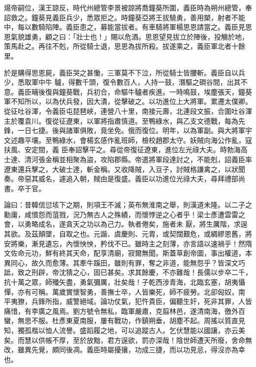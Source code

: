 \begin{pinyinscope}
 煬帝嗣位，漢王諒反，時代州總管李景被諒將喬鐘葵所圍，義臣時為朔州總管，奉詔救之。鐘葵見義臣兵少，悉眾拒之。時鐘葵亞將王拔驍勇，善用槊，射者不能中，每以數騎陷陣。義臣患之，募能當拔者。有車騎將軍楊思恩請當之。義臣見思恩氣貌雄勇，顧之曰：「壯士也！」賜以危酒。思恩望見拔立於陣後，投觴於地，策馬赴之。再往不剋，所從騎士退，思恩為拔所殺。拔遂乘之，義臣軍北者十餘里。



 於是購得思恩屍，義臣哭之甚慟，三軍莫不下泣，所從騎士皆腰斬。義臣自以兵少，悉取軍中牛
 驢，得數千頭，復令數百人，人持一鼓，潛驅之磵谷間，出其不意。義臣晡後復與鐘葵戰，兵初合，命驅牛驢者疾進。一時鳴鼓，埃塵張天，鐘葵軍不知所以，以為伏兵發，因大潰，從擊破之。以功進位上大將軍。累遷太僕卿。從征吐谷渾，令義臣屯琵琶峽，連營八十里，南接元壽，北連段文振，合圍吐谷渾主於覆袁川。復從征遼東，以軍將指肅慎道。至鴨綠水，與乙支文德戰，每為先鋒，一日七捷。後與諸軍俱敗，竟坐免。俄而復位。明年，以為軍副。與大將軍宇文述趣平壤。至鴨綠水，會楊玄感作亂班師，檢校趙郡太守。妖賊向海公作亂，寇扶風、安定間，義
 臣奉詔擊平之。尋從帝復征遼東，進位左光祿大夫。時勃海高士達、清河張金稱並相聚為盜，攻陷郡縣。帝遣將軍段達討之，不能剋，詔義臣率遼東還兵擊之，大破士達，斬金稱。又收降賊，入豆子，討賊格謙禽之，以狀聞奏。帝惡其威名，遽追入朝，賊由是復盛。義臣以功進位光祿大夫，尋拜禮部尚書。卒于官。



 論曰：昔韓信愆垓下之期，則項王不滅；英布無淮南之舉，則漢道未隆。以二子之勳庸，咸憤怨而菹戮，況乃無古人之殊績，而懷悖逆之心者乎！梁士彥遭雲雷之會，以勇略成名，遂貪天之功以為己力。執者倦矣，施者未
 厭，將生厲階，求逞其欲。及茲顛墜，自取之也。元諧、虞慶則、元胄，或契闊艱危，或綢繆恩舊，將安將樂，漸見遺忘，內懷怏怏，矜伐不已。雖時主之刻薄，亦言語以速禍乎！然隋文佐命元功，鮮有終其天命，配享清廟，寂爾無聞。斯蓋草創帝圖，事出權道，本異同心，故久而愈薄。其牽牛蹊田，雖則有罪，奪之非道，能無怨乎？皆深文巧詆，致之刑辟，帝沈猜之心，固已甚矣。求其餘慶，不亦難哉！長儒以步卒二千，抗十萬之眾，師殲矢盡，勇氣彌厲，壯矣哉！子乾西涉青海，北臨玄塞，胡夷懾憚，亦有可稱。萬歲實懷智勇，善撫士卒，人皆樂死，師不疲勞。北卻匈奴，南
 平夷獠，兵鋒所指，威警絕域。論功仗氣，犯忤貴臣，偏聽生奸，死非其罪，人皆痛惜，有李廣之風焉。劉方號令無私，臨軍嚴肅，克翦林邑，遂清南海，徼外百蠻，無思不服。杜彥東夏南服，屢有戰功，作鎮朔垂，胡塵不起。周搖以質直見知，獨孤楷以恤人流譽。盛蹈履之地，可以追蹤古人。乞伏慧能以國讓，亦云美矣。而慧以供帳不厚，至於放黜，君方逞欲，罰亦深哉！陰世師遭天所廢，舍命無改，雖異先覺，頗同後凋。義臣時屬擾攘，功成三捷，而以功見忌，得沒亦為幸也。



\end{pinyinscope}